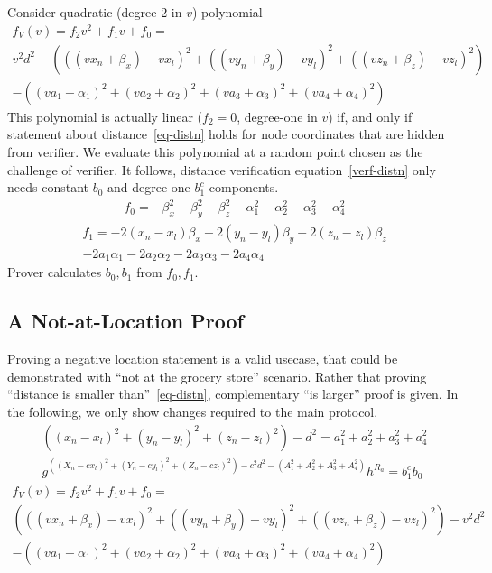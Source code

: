\documentclass{article}
\begin{document}
Consider quadratic (degree 2 in $v$) polynomial
\begin{multline}
f_V(v) = f_2 v^2 + f_1 v + f_0 = \\
v^2 d^2 - (((v x_n + \beta_x) - v x_l)^2 +
((v y_n + \beta_y) - v y_l)^2 +
((v z_n + \beta_z) - v z_l)^2)  \\
- ((v a_1 + \alpha_1)^2 +
(v a_2 + \alpha_2)^2 +
(v a_3 + \alpha_3)^2 +
(v a_4 + \alpha_4)^2)
\end{multline}
This polynomial is actually linear ($f_2 = 0$, degree-one in $v$)
if, and only if
statement about distance~\eqref{eq-distn} holds for node coordinates that are hidden from verifier.
We evaluate this polynomial at a random point chosen as the challenge of verifier.
It follows, distance verification equation~\eqref{verf-distn}
only needs constant $b_0$ and degree-one $b_1^c$ components.
\begin{gather}
f_0 = -\beta_x^2 - \beta_y^2 - \beta_z^2 - \alpha_1^2 - \alpha_2^2 - \alpha_3^2 - \alpha_4^2
\end{gather}
\begin{multline}
f_1 = -2 (x_n - x_l) \beta_x  -2 (y_n - y_l) \beta_y  -2 (z_n - z_l) \beta_z \\
-2 a_1 \alpha_1 -2 a_2 \alpha_2 -2 a_3 \alpha_3 -2 a_4 \alpha_4
\end{multline}
Prover calculates $b_0, b_1$ from $f_0, f_1$.

\subsection{A Not-at-Location Proof}

Proving a negative location statement is a valid usecase,
that could be demonstrated with ``not at the grocery store'' scenario.
Rather that proving ``distance is smaller than''~\eqref{eq-distn},
complementary ``is larger'' proof is given. %
In the following, we only show changes required to the main protocol.
\begin{gather}
\label{eq-distn-more}
((x_n - x_l)^2 + (y_n - y_l)^2 + (z_n - z_l)^2) - d^2 = a_1^2 + a_2^2 + a_3^2 + a_4^2  \\
\label{verf-distn-more}
g^{((X_n - c x_l)^2 + (Y_n - c y_l)^2 + (Z_n - c z_l)^2 ) - c^2 d^2 - (A_1^2 + A_2^2 + A_3^2 + A_4^2)} h^{R_a} = b_1^{c} b_0 
\end{gather}
\begin{multline}
\label{eq-coeff-more}
f_V(v) = f_2 v^2 + f_1 v + f_0 = \\
(((v x_n + \beta_x) - v x_l)^2 +
((v y_n + \beta_y) - v y_l)^2 +
((v z_n + \beta_z) - v z_l)^2)
- v^2 d^2 \\
- ((v a_1 + \alpha_1)^2 +
(v a_2 + \alpha_2)^2 +
(v a_3 + \alpha_3)^2 +
(v a_4 + \alpha_4)^2)
\end{multline}
\end{document}
